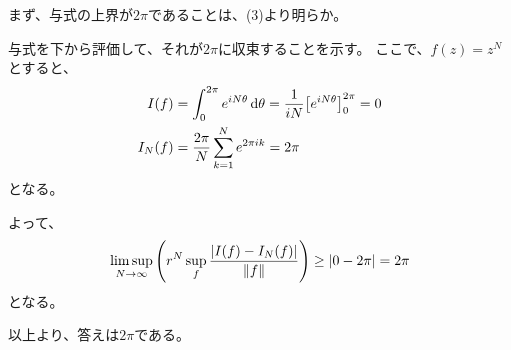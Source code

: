 \documentclass[a4paper, 10pt, dvipdfmx]{jlreq}
\begin{document}
まず、与式の上界が$2\pi$であることは、(3)より明らか。

与式を下から評価して、それが$2\pi$に収束することを示す。
ここで、$f(z)=z^N$とすると、
\begin{align*}
  I(f)   & =\int_0^{2\pi} e^{iN\theta} \dd{\theta} = \frac{1}{iN} \qty[e^{iN\theta}]_0^{2\pi} = 0\\
  I_N(f) & =\frac{2\pi}{N} \sum_{k=1}^N e^{2\pi i k} = 2\pi
\end{align*}
となる。

よって、
\begin{equation*}
  \limsup_{N \to \infty} \qty(r^N \sup_f \frac{\abs{I(f)-I_N(f)}}{\norm{f}}) \geq  \abs{0-2\pi} = 2\pi
\end{equation*}
となる。

以上より、答えは$2\pi$である。
\end{document}

